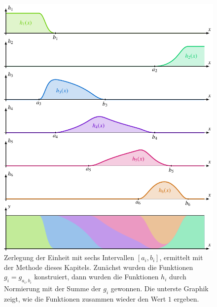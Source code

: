%
%
%
\begin{figure}
\centering
\includegraphics{chapters/030-kurvenintegral/images/zerlegung.pdf}
\caption{Zerlegung der Einheit mit sechs Intervallen $[a_i,b_i]$,
ermittelt mit der Methode dieses Kapitels.
Zunächst wurden die Funktionen $g_i = g_{a_i,b_i}$ konstruiert, dann
wurden die Funktionen $h_i$ durch Normierung mit der Summe der $g_i$
gewonnen.
Die unterste Graphik zeigt, wie die Funktionen zusammen wieder den
Wert $1$ ergeben.
\label{buch:kurvenintegral:fig:zerlegung}}
\end{figure}
